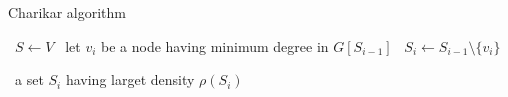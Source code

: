 \begin{algorithm}
    \caption{Charikar algorithm}\label{alg:charikar_greedy}
    \begin{algorithmic}%
            \State~$S \gets V$
                    \State~let $v_i$ be a node having minimum degree in $G[S_{i-1}]$
                    \State~$S_i \gets S_{i-1} \setminus \{v_i\}$
                \EndFor
                
            \Return~a set $S_i$ having larget density $\rho(S_i)$
        \EndProcedure
    \end{algorithmic}
\end{algorithm}